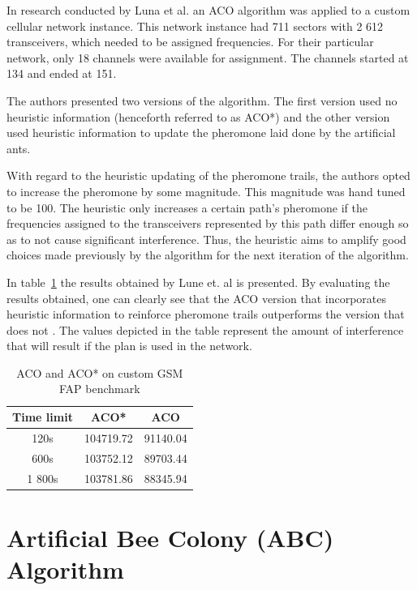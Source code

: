 In research conducted by Luna et al.\cite{ACOvsEA} an \gls{ACO} algorithm was applied to a custom cellular network instance. This network instance had 711 sectors with 2 612 transceivers, which needed to be assigned frequencies. For their particular network, only 18 channels were available for assignment. The channels started at 134 and ended at 151\cite{ACOvsEA}.

The authors presented two versions of the algorithm. The first version used no heuristic information (henceforth referred to as \gls{ACO}*) and the other version used heuristic information to update the pheromone laid done by the artificial ants\cite{ACOvsEA}.

With regard to the heuristic updating of the pheromone trails, the authors opted to increase the pheromone by some magnitude\cite{ACOvsEA}. This magnitude was hand tuned to be 100. The heuristic only increases a certain path's pheromone if the frequencies assigned to the transceivers represented by this path differ enough so as to not cause significant interference\cite{ACOvsEA}. Thus, the heuristic aims to amplify good choices made previously by the algorithm for the next iteration of the algorithm.

In table~\ref{tab:ACO} the results obtained by Lune et. al \cite{ACOvsEA} is presented. By evaluating the results obtained, one can clearly see that the \gls{ACO} version that incorporates heuristic information to reinforce pheromone trails outperforms the version that does not \cite{ACOvsEA}. The values depicted in the table represent the amount of interference that will result if the plan is used in the network\cite{ACOvsEA}.
\begin{table}[H]
\centering
	\begin{tabular}{| c | c | c |}
	\hline
	Time limit & \gls{ACO}* & \gls{ACO} \\ \hline
	120s & 104719.72 & 91140.04 \\ \hline
	600s & 103752.12 & 89703.44 \\ \hline
	1 800s & 103781.86 & 88345.94 \\ \hline
	\end{tabular}
\caption{ACO and \gls{ACO}* on custom GSM \gls{FAP} benchmark\cite{ACOvsEA}}
\label{tab:ACO}
\end{table}
\newpage
\section{Artificial Bee Colony (ABC) Algorithm}
\label{sec:BEE}

